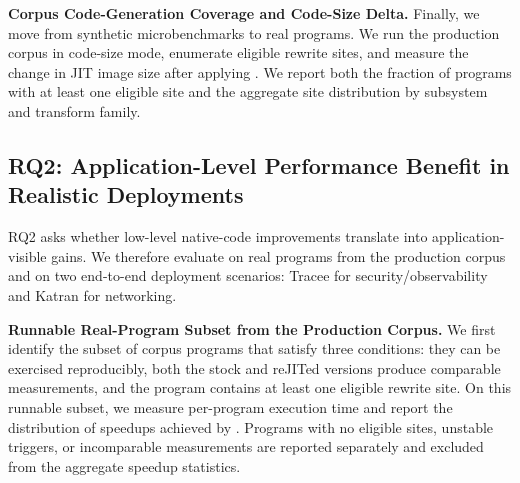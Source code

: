 \noindent\textbf{Corpus Code-Generation Coverage and Code-Size Delta.}
Finally, we move from synthetic microbenchmarks to real programs. We run the production corpus in code-size mode, enumerate eligible rewrite sites, and measure the change in JIT image size after applying \tool. We report both the fraction of programs with at least one eligible site and the aggregate site distribution by subsystem and transform family.


\subsection{RQ2: Application-Level Performance Benefit in Realistic Deployments}
\label{subsec:rq2}

RQ2 asks whether low-level native-code improvements translate into application-visible gains. We therefore evaluate \tool on real programs from the production corpus and on two end-to-end deployment scenarios: Tracee for security/observability and Katran for networking.

\noindent\textbf{Runnable Real-Program Subset from the Production Corpus.}
We first identify the subset of corpus programs that satisfy three conditions: they can be exercised reproducibly, both the stock and reJITed versions produce comparable measurements, and the program contains at least one eligible rewrite site. On this runnable subset, we measure per-program execution time and report the distribution of speedups achieved by \tool. Programs with no eligible sites, unstable triggers, or incomparable measurements are reported separately and excluded from the aggregate speedup statistics.


